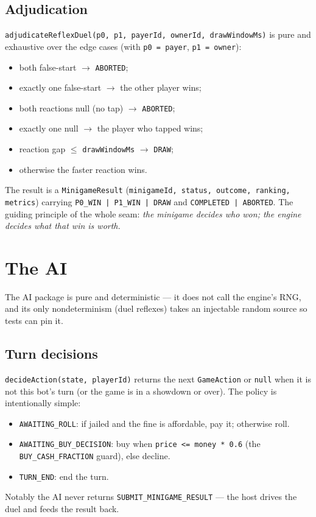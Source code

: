 \documentclass[11pt,a4paper]{article}
\newcommand{\code}[1]{\texttt{#1}}
\begin{document}
\subsection{Adjudication}
\code{adjudicateReflexDuel(p0, p1, payerId, ownerId, drawWindowMs)} is pure and
exhaustive over the edge cases (with \code{p0 = payer}, \code{p1 = owner}):
\begin{itemize}[leftmargin=1.4em,nosep]
  \item both false-start $\to$ \code{ABORTED};
  \item exactly one false-start $\to$ the other player wins;
  \item both reactions null (no tap) $\to$ \code{ABORTED};
  \item exactly one null $\to$ the player who tapped wins;
  \item reaction gap $\le$ \code{drawWindowMs} $\to$ \code{DRAW};
  \item otherwise the faster reaction wins.
\end{itemize}
The result is a \code{MinigameResult} (\code{minigameId, status, outcome,
ranking, metrics}) carrying \code{P0\_WIN | P1\_WIN | DRAW} and \code{COMPLETED
| ABORTED}. The guiding principle of the whole seam:
\emph{the minigame decides who won; the engine decides what that win is worth.}

\section{The AI}

The AI package is pure and deterministic --- it does not call the engine's RNG,
and its only nondeterminism (duel reflexes) takes an injectable random source
so tests can pin it.

\subsection{Turn decisions}
\code{decideAction(state, playerId)} returns the next \code{GameAction} or
\code{null} when it is not this bot's turn (or the game is in a showdown or
over). The policy is intentionally simple:
\begin{itemize}[leftmargin=1.4em,nosep]
  \item \code{AWAITING\_ROLL}: if jailed and the fine is affordable, pay it;
        otherwise roll.
  \item \code{AWAITING\_BUY\_DECISION}: buy when \code{price <= money * 0.6}
        (the \code{BUY\_CASH\_FRACTION} guard), else decline.
  \item \code{TURN\_END}: end the turn.
\end{itemize}
Notably the AI never returns \code{SUBMIT\_MINIGAME\_RESULT} --- the host drives
the duel and feeds the result back.
\end{document}
